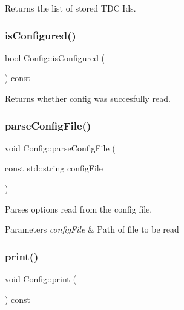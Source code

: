 Returns the list of stored T\+DC Ids. 

\mbox{\label{class_config_a47870f3f5bc52f5d0aa387c25e431055}} 
\subsubsection{\texorpdfstring{is\+Configured()}{isConfigured()}}
{\footnotesize\ttfamily bool Config\+::is\+Configured (\begin{DoxyParamCaption}{ }\end{DoxyParamCaption}) const\hspace{0.3cm}{\ttfamily [inline]}}



Returns whether config was succesfully read. 

\mbox{\label{class_config_a3092a6e3ba0458b6bedca09f841f554e}} 
\subsubsection{\texorpdfstring{parse\+Config\+File()}{parseConfigFile()}}
{\footnotesize\ttfamily void Config\+::parse\+Config\+File (\begin{DoxyParamCaption}\item[{const std\+::string}]{config\+File }\end{DoxyParamCaption})\hspace{0.3cm}{\ttfamily [private]}}



Parses options read from the config file. 


\begin{DoxyParams}{Parameters}
{\em config\+File} & Path of file to be read \\
\hline
\end{DoxyParams}
\mbox{\label{class_config_af75cb5a60c6cac9d6f6d030e65a5240a}} 
\subsubsection{\texorpdfstring{print()}{print()}}
{\footnotesize\ttfamily void Config\+::print (\begin{DoxyParamCaption}{ }\end{DoxyParamCaption}) const}



